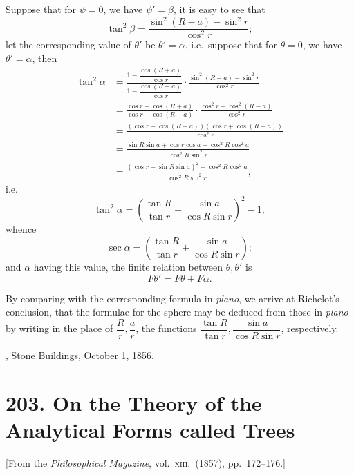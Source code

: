 \documentclass[12pt,a4paper]{article}
\theoremstyle{plain}
\begin{document}
Suppose that for $\psi=0$, we have $\psi'=\beta$, it is easy to see that
\[
\tan^2\beta=\frac{\sin^2(R-a)-\sin^2 r}{\cos^2 r};
\]
let the corresponding value of $\theta'$ be $\theta'=\alpha$, i.e.\ suppose that for $\theta=0$, we have $\theta'=\alpha$, then
\begin{align*}
\tan^2\alpha &= \frac{1-\dfrac{\cos(R+a)}{\cos r}}{1-\dfrac{\cos(R-a)}{\cos r}}\cdot\frac{\sin^2(R-a)-\sin^2 r}{\cos^2 r}\\
&= \frac{\cos r-\cos(R+a)}{\cos r-\cos(R-a)}\cdot\frac{\cos^2 r-\cos^2(R-a)}{\cos^2 r}\\
&= \frac{(\cos r-\cos(R+a))(\cos r+\cos(R-a))}{\cos^2 r}\\
&= \frac{\sin R\sin a+\cos r\cos a-\cos^2 R\cos^2 a}{\cos^2 R\sin^2 r}\\
&= \frac{(\cos r+\sin R\sin a)^2-\cos^2 R\cos^2 a}{\cos^2 R\sin^2 r},
\end{align*}
i.e.
\[
\tan^2\alpha=\left(\frac{\tan R}{\tan r}+\frac{\sin a}{\cos R\sin r}\right)^2-1,
\]
whence
\[
\sec\alpha=\left(\frac{\tan R}{\tan r}+\frac{\sin a}{\cos R\sin r}\right);
\]
and $\alpha$ having this value, the finite relation between $\theta,\theta'$ is
\[
F\theta'=F\theta+F\alpha.
\]

By comparing with the corresponding formula in \textit{plano}, we arrive at Richelot's conclusion, that the formulae for the sphere may be deduced from those in \textit{plano} by writing in the place of $\dfrac{R}{r},\dfrac{a}{r}$, the functions $\dfrac{\tan R}{\tan r},\dfrac{\sin a}{\cos R\sin r}$, respectively.

\bigskip

, Stone Buildings, October 1, 1856.

\vfill\newpage


\section*{203. On the Theory of the Analytical Forms called Trees}

\begin{center}
[From the \textit{Philosophical Magazine}, vol.~\textsc{xiii}.\ (1857), pp.~172--176.]
\end{center}
\end{document}
